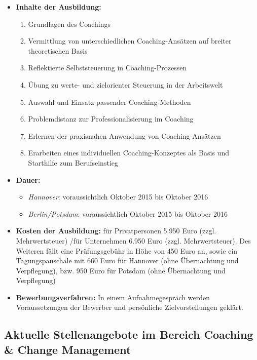 \documentclass[11pt,a4paper]{article}
\begin{document}
	\begin{itemize}
	\item \textbf{Inhalte der Ausbildung:}

			\begin{enumerate}
			\item Grundlagen des Coachings
			\item Vermittlung von unterschiedlichen Coaching-Ansätzen auf breiter theoretischen Basis
			\item Reflektierte Selbststeuerung in Coaching-Prozessen
			\item Übung zu werte- und zielorienter Steuerung in der Arbeitswelt
			\item Auswahl und Einsatz passender Coaching-Methoden
			\item Problemdistanz zur Professionalisierung im Coaching 
			\item Erlernen der praxisnahen Anwendung von Coaching-Ansätzen
			\item Erarbeiten eines individuellen Coaching-Konzeptes als Basis und Starthilfe zum Berufseinstieg
			\end{enumerate}

	\item \textbf{Dauer:}

		\begin{itemize} 
		\item \textsl{Hannover}: voraussichtlich Oktober 2015 bis Oktober 2016
		\item \textsl{Berlin/Potsdam}: voraussichtlich Oktober 2015 bis Oktober 2016
		\end{itemize}

	\item \textbf{Kosten der Ausbildung:} für Privatpersonen 5.950 Euro (zzgl. Mehrwertsteuer) /für Unternehmen 6.950 Euro (zzgl. Mehrwertsteuer). Des Weiteren fällt eine Prüfungsgebühr in Höhe von 450 Euro an, sowie ein Tagungspauschale mit 660 Euro für Hannover (ohne Übernachtung und Verpflegung), bzw. 950 Euro für Potsdam (ohne Übernachtung und Verpflegung)

	\item \textbf{Bewerbungsverfahren:} In einem Aufnahmegespräch werden Voraussetzungen der Bewerber und persönliche Zielvorstellungen geklärt.


	\end{itemize}

\newpage

\subsection*{\textsf{Aktuelle Stellenangebote im Bereich Coaching \& Change Management}}
\end{document}
